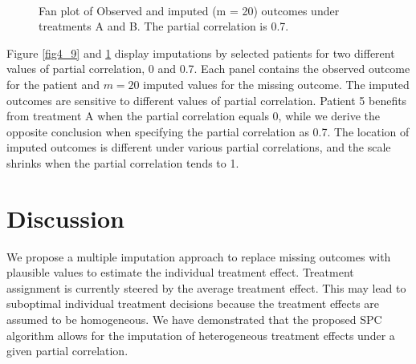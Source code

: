 \begin{figure}[ht!]
\begin{center}
{{				}
			}\\
		\end{center}
		\caption{Fan plot of Observed and imputed (m = 20) outcomes under treatments A and B. The partial correlation is 0.7.}
		\label{fig4_10}
	\end{figure}
	Figure \ref{fig4_9} and \ref{fig4_10} display imputations by selected patients for two different values of partial correlation, 0 and 0.7. Each panel contains the observed outcome for the patient and $m = 20$ imputed values for the missing outcome. The imputed outcomes are sensitive to different values of partial correlation. Patient 5 benefits from treatment A when the partial correlation equals 0, while we derive the opposite conclusion when specifying the partial correlation as 0.7. The location of imputed outcomes is different under various partial correlations, and the scale shrinks when the partial correlation tends to 1.  
	
	\section{Discussion}
	\label{sec:4.7}
	We propose a multiple imputation approach to replace missing outcomes with plausible values to estimate the individual treatment effect. Treatment assignment is currently steered by the average treatment effect. This may lead to suboptimal individual treatment decisions because the treatment effects are assumed to be homogeneous. We have demonstrated that the proposed SPC algorithm allows for the imputation of heterogeneous treatment effects under a given partial correlation. 
	
